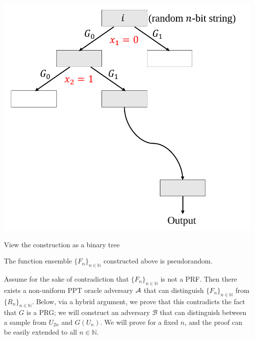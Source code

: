\begin{marginfigure}
    \centering
    \includegraphics[width=\textwidth]{Old Scribe Notes/binary-tree.pdf}
    \caption{View the construction as a binary tree}
    \label{fig:binary-tree}
\end{marginfigure}

\begin{theorem}\label{theorem:ggm}
    The function ensemble $\{F_n\}_{n \in \mathbb{N}}$ constructed above is pseudorandom.
\end{theorem}

\proof
Assume for the sake of contradiction that $\{F_n\}_{n \in \mathbb{N}}$ is not a PRF.
Then there exists a non-uniform PPT oracle adversary $\mathcal{A}$ that can distinguish $\{F_n\}_{n \in \mathbb{N}}$ from $\{R_n\}_{n \in \mathbb{N}}$. Below, via a hybrid argument, we prove that this contradicts the fact that $G$ is a PRG; we will construct an adversary $\mathcal{B}$ that can distinguish between a sample from $U_{2n}$ and $G(U_{n})$. We will prove for a fixed $n$, and the proof can be easily extended to all $n \in \mathbb{N}$.\smallskip

